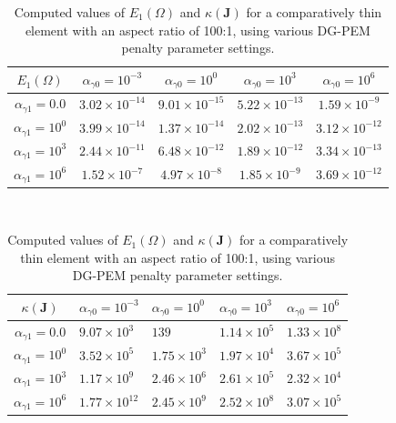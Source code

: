 \begin{table}
\centering
\begin{subtable}{1.0\textwidth}
\centering
\begin{tabular}{| c || c | c | c | c |}
    \hline
$E_1 (\Omega)$ & $\alpha_{\gamma0} = 10^{-3}$ & $\alpha_{\gamma0} = 10^{0}$ & $\alpha_{\gamma0} = 10^{3}$ & $\alpha_{\gamma0} = 10^{6}$ \\ \hline \hline
$\alpha_{\gamma1} = 0.0$	& $3.02 \times 10^{-14}$ & $9.01 \times 10^{-15}$ & $5.22 \times 10^{-13}$ & $1.59 \times 10^{-9}$ \\ \hline
$\alpha_{\gamma1} = 10^{0}$ & $3.99 \times 10^{-14}$ & $1.37 \times 10^{-14}$ & $2.02 \times 10^{-13}$ & $3.12 \times 10^{-12}$ \\ \hline
$\alpha_{\gamma1} = 10^{3}$ & $2.44 \times 10^{-11}$ & $6.48 \times 10^{-12}$ & $1.89 \times 10^{-12}$ & $3.34 \times 10^{-13}$ \\ \hline
$\alpha_{\gamma1} = 10^{6}$ & $1.52 \times 10^{-7}$ & $4.97 \times 10^{-8}$ & $1.85 \times 10^{-9}$ & $3.69 \times 10^{-12}$ \\
    \hline
    \end{tabular}
    \caption{Interpolation error: $E_1 (\Omega)$}
    \label{tab:thin_interpolation_error_k1}
\end{subtable}%
\\
\begin{subtable}{1.0\textwidth}
\centering
\begin{tabular}{| c || l | l | l | l |}
    \hline
$\kappa(\bm{J})$ & $\alpha_{\gamma0} = 10^{-3}$	&	$\alpha_{\gamma0} = 10^{0}$	&	$\alpha_{\gamma0} = 10^{3}$	&	$\alpha_{\gamma0} = 10^{6}$ \\ \hline \hline
$\alpha_{\gamma1} = 0.0$	& $9.07 \times 10^{3}$ & $139$ & $1.14 \times 10^{5}$ & $1.33 \times 10^{8}$ \\ \hline
$\alpha_{\gamma1} = 10^{0}$	& $3.52 \times 10^{5}$ & $1.75 \times 10^{3}$ & $1.97 \times 10^{4}$ & $3.67 \times 10^{5}$ \\ \hline
$\alpha_{\gamma1} = 10^{3}$	& $1.17 \times 10^{9}$ & $2.46 \times 10^{6}$ & $2.61 \times 10^{5}$ & $2.32 \times 10^{4}$ \\ \hline
$\alpha_{\gamma1} = 10^{6}$	& $1.77 \times 10^{12}$ & $2.45 \times 10^{9}$ & $2.52 \times 10^{8}$ & $3.07 \times 10^{5}$ \\
    \hline
    \end{tabular}
    \caption{DG-PEM linear system conditioning: $\kappa(\bm{J})$}
    \label{tab:thin_condJ_k1}
\end{subtable}

\caption{Computed values of $E_1 (\Omega)$ and $\kappa(\bm{J})$ for a comparatively thin element with an aspect ratio of 100:1, using various DG-PEM penalty parameter settings.}
\label{tab:thin_interpolation_error_and_condJ_k1}
\end{table}

